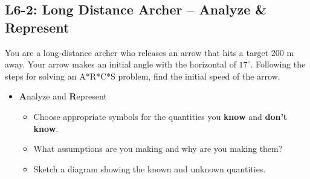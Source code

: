 \documentclass[]{article}
\begin{document}
\begin{PresentSpace}
\vspace{-10pt}
\section*{L6-2: Long Distance Archer -- Analyze \& Represent}
\vspace{-10pt}
You are a long-distance archer who releases an arrow that hits a target 200 m away. Your arrow makes an initial angle with the horizontal of $17^{\circ}$. Following the steps for solving an A*R*C*S problem, find the initial speed of the arrow.
\begin{itemize}
	\item \textbf{A}nalyze and \textbf{R}epresent
	\begin{itemize}
		\item Choose appropriate symbols for the quantities you \textbf{know} and \textbf{don't know}.
		\item What assumptions are you making and why are you making them?
		\item Sketch a diagram showing the known and unknown quantities.
	\end{itemize}
\end{itemize}
\end{PresentSpace}
\newpage
\end{document}
